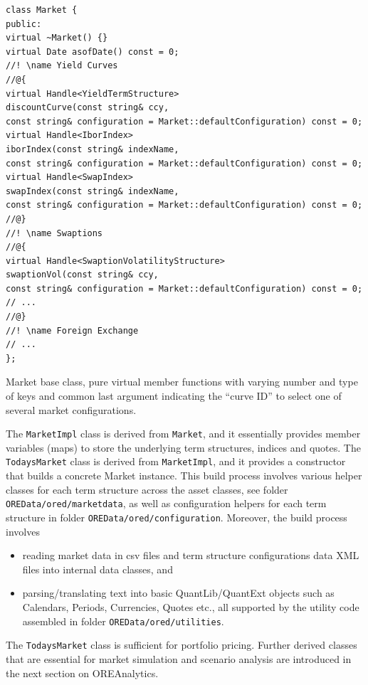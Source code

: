 \documentclass[12pt, a4paper]{report}
\begin{document}
\begin{listing}[H]
\begin{verbatim}
class Market {
public:
virtual ~Market() {}
virtual Date asofDate() const = 0;
//! \name Yield Curves
//@{
virtual Handle<YieldTermStructure>
discountCurve(const string& ccy,
const string& configuration = Market::defaultConfiguration) const = 0;
virtual Handle<IborIndex>
iborIndex(const string& indexName,
const string& configuration = Market::defaultConfiguration) const = 0;
virtual Handle<SwapIndex>
swapIndex(const string& indexName,
const string& configuration = Market::defaultConfiguration) const = 0;
//@}
//! \name Swaptions
//@{
virtual Handle<SwaptionVolatilityStructure>
swaptionVol(const string& ccy,
const string& configuration = Market::defaultConfiguration) const = 0;
// ...
//@}
//! \name Foreign Exchange
// ...
};
\end{verbatim}
\caption{Market base class, pure virtual member functions with varying number and type of keys and common last argument indicating the ``curve ID'' to select one of several market configurations.}
\label{1st:marketdata}
\end{listing}

The {\tt MarketImpl} class is derived from {\tt Market}, and it essentially provides member variables (maps) to store the underlying term structures, indices and quotes.
The {\tt TodaysMarket} class is derived from {\tt MarketImpl}, and it provides a constructor that builds a concrete Market instance. 
This build process involves various helper classes for each term structure across the asset classes, see folder {\tt OREData/ored/marketdata}, as well as configuration helpers for each term structure in folder {\tt OREData/ored/configuration}. Moreover, the build process involves
\begin{itemize}
\item reading market data in csv files and term structure configurations data XML files into internal data classes, and
\item parsing/translating text into basic QuantLib/QuantExt objects such as Calendars, Periods, Currencies, Quotes etc., all supported by the utility code assembled in folder {\tt OREData/ored/utilities}.
\end{itemize}
The {\tt TodaysMarket} class is sufficient for portfolio pricing. Further derived classes that are essential for market simulation and scenario analysis are introduced in the next section on OREAnalytics.
\end{document}
